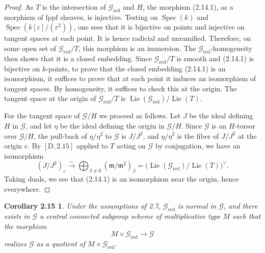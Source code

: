 \documentclass[11pt]{article}
\newcommand{\Lie}{\operatorname{Lie}}
\newcommand{\red}{\mathrm{red}}
\newtheorem*{corollary215}{Corollary 2.15}
\begin{document}
\begin{proof}
As \(T\) is the intersection of \(\mathcal G_{\red}\) and \(H\), the morphism (2.14.1),
as a morphism of fppf sheaves, is injective. Testing on \(\operatorname{Spec}(k)\) and
\(\operatorname{Spec}(k[\varepsilon]/(\varepsilon^2))\), one sees that it is bijective
on points and injective on tangent spaces at each point. It is hence radicial and
unramified. Therefore, on some open set of \(\mathcal G_{\red}/T\), this morphism is
an immersion. The \(\mathcal G_{\red}\)-homogeneity then shows that it is a closed
embedding. Since \(\mathcal G_{\red}/T\) is smooth and (2.14.1) is bijective on
\(k\)-points, to prove that the closed embedding (2.14.1) is an isomorphism, it
suffices to prove that at each point it induces an isomorphism of tangent spaces. By
homogeneity, it suffices to check this at the origin. The tangent space at the origin of
\(\mathcal G_{\red}/T\) is \(\Lie(\mathcal G_{\red})/\Lie(T)\).

For the tangent space of \(\mathcal G/H\) we proceed as follows. Let \(J\) be the ideal
defining \(H\) in \(\mathcal G\), and let \(\eta\) be the ideal defining the origin in
\(\mathcal G/H\). Since \(\mathcal G\) is an \(H\)-torsor over \(\mathcal G/H\), the
pull-back of \(\eta/\eta^2\) to \(\mathcal G\) is \(J/J^2\), and \(\eta/\eta^2\) is the
fiber of \(J/J^2\) at the origin \(e\). By \([\mathrm D,2.15]\) applied to \(T\) acting
on \(\mathcal G\) by conjugation, we have an isomorphism
\[
  (J/J^2)_e \xrightarrow{\sim}
  \bigoplus_{\beta\ne0}(\mathfrak m/\mathfrak m^2)_\beta
  =\bigl(\Lie(\mathcal G_{\red})/\Lie(T)\bigr)^\vee .
\]
Taking duals, we see that (2.14.1) is an isomorphism near the origin, hence everywhere.
\end{proof}

\begin{corollary215}
Under the assumptions of 2.7, \(\mathcal G_{\red}\) is normal in \(\mathcal G\), and
there exists in \(\mathcal G\) a central connected subgroup scheme of multiplicative
type \(M\) such that the morphism
\[
  M\times \mathcal G_{\red}\longrightarrow \mathcal G
\]
realizes \(\mathcal G\) as a quotient of \(M\times\mathcal G_{\red}\).
\end{corollary215}
\end{document}
